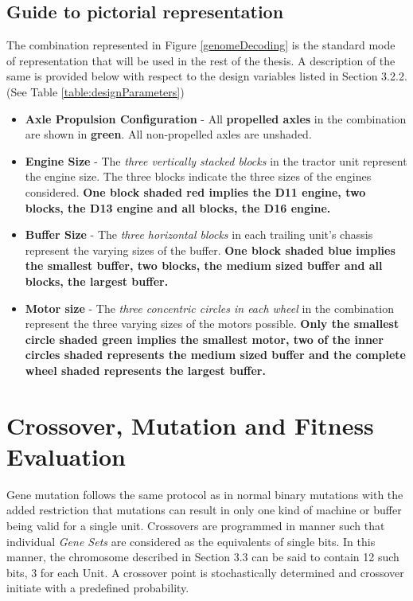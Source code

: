 \documentclass[ExampleMasters.tex]{subfiles}
\begin{document}
		\subsection{Guide to pictorial representation}
		The combination represented in Figure \ref{genomeDecoding} is the standard mode of representation that will be used in the rest of the thesis. A description of the same is provided below with respect to the design variables listed in Section 3.2.2. (See Table \ref{table:designParameters})\\

		\begin{itemize}
			\item \textbf{Axle Propulsion Configuration} - All \textbf{propelled axles} in the combination are shown in \textbf{green}. All non-propelled axles are unshaded.
			\item \textbf{Engine Size} - The \textit{three vertically stacked blocks} in the tractor unit represent the engine size. The three blocks indicate the three sizes of the engines considered. \textbf{One block shaded red implies the D11 engine, two blocks, the D13 engine and all blocks, the D16 engine.}
			\item \textbf{Buffer Size} - The \textit{three horizontal blocks} in each trailing unit's chassis represent the varying sizes of the buffer. \textbf{One block shaded blue implies the smallest buffer, two blocks, the medium sized buffer and all blocks, the largest buffer.}
			\item \textbf{Motor size} - The \textit{three concentric circles in each wheel} in the combination represent the three varying sizes of the motors possible. \textbf{Only the smallest circle shaded green implies the smallest motor, two of the inner circles shaded represents the medium sized buffer and the complete wheel shaded represents the largest buffer.}
		\end{itemize}


	\section{Crossover, Mutation and Fitness Evaluation}
		Gene mutation follows the same protocol as in normal binary mutations with the added restriction that mutations can result in only one kind of machine or buffer being valid for a single unit. Crossovers are programmed in manner such that individual \textit{Gene Sets} are considered as the equivalents of single bits. In this manner, the chromosome described in Section 3.3 can be said to contain 12 such bits, 3 for each Unit. A crossover point is stochastically determined and crossover initiate with a predefined probability.\\
\end{document}

